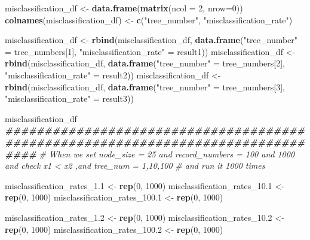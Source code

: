 \documentclass[
]{article}
\newenvironment{Shaded}{\begin{snugshade}}{\end{snugshade}}
\newcommand{\AttributeTok}[1]{\textcolor[rgb]{0.13,0.29,0.53}{#1}}
\newcommand{\CommentTok}[1]{\textcolor[rgb]{0.56,0.35,0.01}{\textit{#1}}}
\newcommand{\DecValTok}[1]{\textcolor[rgb]{0.00,0.00,0.81}{#1}}
\newcommand{\DocumentationTok}[1]{\textcolor[rgb]{0.56,0.35,0.01}{\textbf{\textit{#1}}}}
\newcommand{\FloatTok}[1]{\textcolor[rgb]{0.00,0.00,0.81}{#1}}
\newcommand{\FunctionTok}[1]{\textcolor[rgb]{0.13,0.29,0.53}{\textbf{#1}}}
\newcommand{\NormalTok}[1]{#1}
\newcommand{\OtherTok}[1]{\textcolor[rgb]{0.56,0.35,0.01}{#1}}
\newcommand{\StringTok}[1]{\textcolor[rgb]{0.31,0.60,0.02}{#1}}
\begin{document}
\begin{Shaded}
\begin{Highlighting}[]
\NormalTok{misclassification\_df }\OtherTok{\textless{}{-}} \FunctionTok{data.frame}\NormalTok{(}\FunctionTok{matrix}\NormalTok{(}\AttributeTok{ncol =} \DecValTok{2}\NormalTok{, }\AttributeTok{nrow=}\DecValTok{0}\NormalTok{))}
\FunctionTok{colnames}\NormalTok{(misclassification\_df) }\OtherTok{\textless{}{-}} \FunctionTok{c}\NormalTok{(}\StringTok{"tree\_number"}\NormalTok{, }\StringTok{"misclassification\_rate"}\NormalTok{)}

\NormalTok{misclassification\_df }\OtherTok{\textless{}{-}} \FunctionTok{rbind}\NormalTok{(misclassification\_df, }\FunctionTok{data.frame}\NormalTok{(}\StringTok{"tree\_number"} \OtherTok{=}\NormalTok{ tree\_numbers[}\DecValTok{1}\NormalTok{], }\StringTok{"misclassification\_rate"} \OtherTok{=}\NormalTok{ result1))  }
\NormalTok{misclassification\_df }\OtherTok{\textless{}{-}} \FunctionTok{rbind}\NormalTok{(misclassification\_df, }\FunctionTok{data.frame}\NormalTok{(}\StringTok{"tree\_number"} \OtherTok{=}\NormalTok{ tree\_numbers[}\DecValTok{2}\NormalTok{], }\StringTok{"misclassification\_rate"} \OtherTok{=}\NormalTok{ result2))  }
\NormalTok{misclassification\_df }\OtherTok{\textless{}{-}} \FunctionTok{rbind}\NormalTok{(misclassification\_df, }\FunctionTok{data.frame}\NormalTok{(}\StringTok{"tree\_number"} \OtherTok{=}\NormalTok{ tree\_numbers[}\DecValTok{3}\NormalTok{], }\StringTok{"misclassification\_rate"} \OtherTok{=}\NormalTok{ result3))  }

\NormalTok{misclassification\_df}
\DocumentationTok{\#\#\#\#\#\#\#\#\#\#\#\#\#\#\#\#\#\#\#\#\#\#\#\#\#\#\#\#\#\#\#\#\#\#\#\#\#\#\#\#\#\#\#\#\#\#\#\#\#\#\#\#\#\#\#\#\#\#\#\#\#\#\#\#\#\#\#\#\#\#\#\#\#\#\#\#\#\#\#\#}
\CommentTok{\# When we set node\_size = 25 and record\_numbers = 100 and 1000 and check x1 \textless{} x2 ,and tree\_num = 1,10,100}
\CommentTok{\# and run it 1000 times}

\NormalTok{misclassification\_rates\_1}\FloatTok{.1} \OtherTok{\textless{}{-}} \FunctionTok{rep}\NormalTok{(}\DecValTok{0}\NormalTok{, }\DecValTok{1000}\NormalTok{)}
\NormalTok{misclassification\_rates\_10}\FloatTok{.1} \OtherTok{\textless{}{-}} \FunctionTok{rep}\NormalTok{(}\DecValTok{0}\NormalTok{, }\DecValTok{1000}\NormalTok{)}
\NormalTok{misclassification\_rates\_100}\FloatTok{.1} \OtherTok{\textless{}{-}} \FunctionTok{rep}\NormalTok{(}\DecValTok{0}\NormalTok{, }\DecValTok{1000}\NormalTok{)}

\NormalTok{misclassification\_rates\_1}\FloatTok{.2} \OtherTok{\textless{}{-}} \FunctionTok{rep}\NormalTok{(}\DecValTok{0}\NormalTok{, }\DecValTok{1000}\NormalTok{)}
\NormalTok{misclassification\_rates\_10}\FloatTok{.2} \OtherTok{\textless{}{-}} \FunctionTok{rep}\NormalTok{(}\DecValTok{0}\NormalTok{, }\DecValTok{1000}\NormalTok{)}
\NormalTok{misclassification\_rates\_100}\FloatTok{.2} \OtherTok{\textless{}{-}} \FunctionTok{rep}\NormalTok{(}\DecValTok{0}\NormalTok{, }\DecValTok{1000}\NormalTok{)}


\end{Highlighting}
\end{Shaded}
\end{document}
